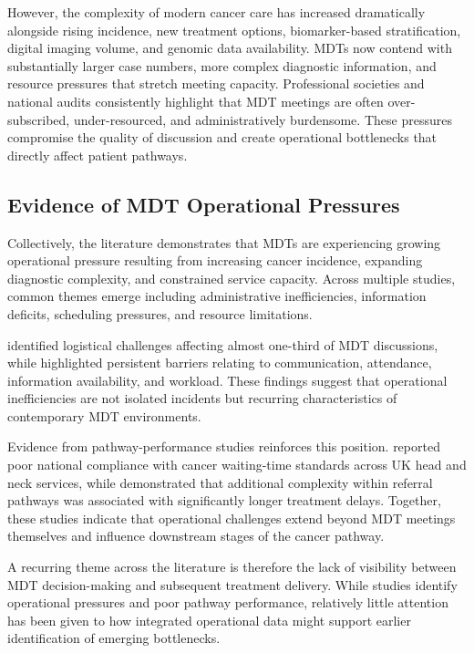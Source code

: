 However, the complexity of modern cancer care has increased dramatically alongside rising incidence, new treatment options, biomarker-based stratification, digital imaging volume, and genomic data availability. MDTs now contend with substantially larger case numbers, more complex diagnostic information, and resource pressures that stretch meeting capacity. Professional societies and national audits consistently highlight that MDT meetings are often over-subscribed, under-resourced, and administratively burdensome. These pressures compromise the quality of discussion and create operational bottlenecks that directly affect patient pathways.

\subsection{Evidence of MDT Operational Pressures}

Collectively, the literature demonstrates that MDTs are experiencing growing operational pressure resulting from increasing cancer incidence, expanding diagnostic complexity, and constrained service capacity. Across multiple studies, common themes emerge including administrative inefficiencies, information deficits, scheduling pressures, and resource limitations.

\cite{soukup2022} identified logistical challenges affecting almost one-third of MDT discussions, while \cite{law2024} highlighted persistent barriers relating to communication, attendance, information availability, and workload. These findings suggest that operational inefficiencies are not isolated incidents but recurring characteristics of contemporary MDT environments.

Evidence from pathway-performance studies reinforces this position. \cite{lim2025} reported poor national compliance with cancer waiting-time standards across UK head and neck services, while \cite{chakravarty2023} demonstrated that additional complexity within referral pathways was associated with significantly longer treatment delays. Together, these studies indicate that operational challenges extend beyond MDT meetings themselves and influence downstream stages of the cancer pathway.

A recurring theme across the literature is therefore the lack of visibility between MDT decision-making and subsequent treatment delivery. While studies identify operational pressures and poor pathway performance, relatively little attention has been given to how integrated operational data might support earlier identification of emerging bottlenecks.


